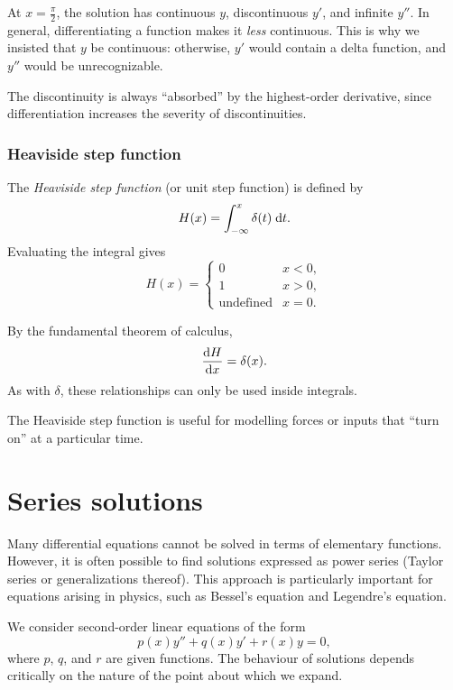 \documentclass[a4paper]{article}
\begin{document}
\begin{remark}
  At $x = \frac{\pi}{2}$, the solution has continuous $y$, discontinuous $y'$, and infinite $y''$. In general, differentiating a function makes it \emph{less} continuous. This is why we insisted that $y$ be continuous: otherwise, $y'$ would contain a delta function, and $y''$ would be unrecognizable.

  The discontinuity is always ``absorbed'' by the highest-order derivative, since differentiation increases the severity of discontinuities.
\end{remark}

\subsubsection{Heaviside step function}
\begin{defi}
  The \emph{Heaviside step function} (or unit step function) is defined by
  \[
    H(x) = \int_{-\infty}^x \delta(t) \;\mathrm{d} t.
  \]
  Evaluating the integral gives
  \[
    H(x) =\begin{cases} 0 & x < 0,\\1 & x > 0,\\\text{undefined} & x = 0.\end{cases}
  \]
  \begin{center}
  \end{center}
  By the fundamental theorem of calculus,
  \[
    \frac{\mathrm{d} H}{\mathrm{d} x} = \delta(x).
  \]
  As with $\delta$, these relationships can only be used inside integrals.
\end{defi}

\begin{remark}
  The Heaviside step function is useful for modelling forces or inputs that ``turn on'' at a particular time.
\end{remark}

\section{Series solutions}
\begin{remark}[Motivation]
  Many differential equations cannot be solved in terms of elementary functions. However, it is often possible to find solutions expressed as power series (Taylor series or generalizations thereof). This approach is particularly important for equations arising in physics, such as Bessel's equation and Legendre's equation.

  We consider second-order linear equations of the form
  \[
    p(x) y'' + q(x) y' + r(x) y = 0,
  \]
  where $p$, $q$, and $r$ are given functions. The behaviour of solutions depends critically on the nature of the point about which we expand.
\end{remark}
\end{document}
